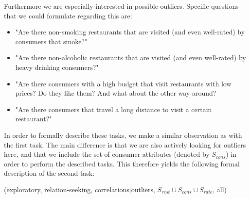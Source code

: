 Furthermore we are especially interested in possible outliers. Specific questions that we could formulate regarding this are:
\begin{itemize}
\setlength{\itemsep}{0cm}%
\setlength{\parskip}{0cm}%
\item "Are there non-smoking restaurants that are visited (and even well-rated) by consumers that smoke?"
\item "Are there non-alcoholic restaurants that are visited (and even well-rated) by heavy drinking consumers?"
\item "Are there consumers with a high budget that visit restaurants with low prices? Do they like them? And what about the other way around?
\item "Are there consumers that travel a long distance to visit a certain restaurant?"
\end{itemize}

In order to formally describe these tasks, we make a similar observation as with the first task. The main difference is that we are also actively looking for outliers here, and that we include the set of consumer attributes (denoted by $S_{cons}$) in order to perform the described tasks. This therefore yields the following formal description of the second task:

(exploratory, relation-seeking, correlations$|$outliers, $S_{rest} \cup S_{cons} \cup S_{rate}$, all)
